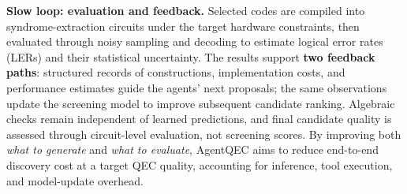 \documentclass[11pt]{article}
\begin{document}
\textbf{Slow loop: evaluation and feedback.} Selected codes are compiled into syndrome-extraction circuits under the target hardware constraints, then evaluated through noisy sampling and decoding to estimate logical error rates (LERs) and their statistical uncertainty. The results support \textbf{two feedback paths}: structured records of constructions, implementation costs, and performance estimates guide the agents' next proposals; the same observations update the screening model to improve subsequent candidate ranking. Algebraic checks remain independent of learned predictions, and final candidate quality is assessed through circuit-level evaluation, not screening scores. By improving both \emph{what to generate} and \emph{what to evaluate}, AgentQEC aims to reduce end-to-end discovery cost at a target QEC quality, accounting for inference, tool execution, and model-update overhead.
\end{document}
